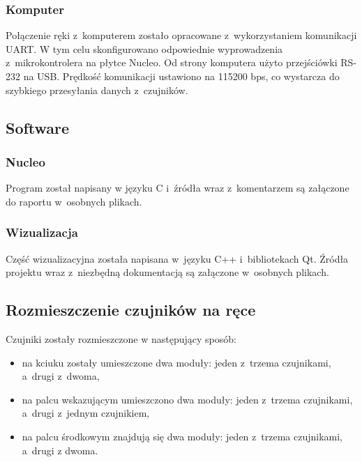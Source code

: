 \documentclass[a4paper,12pt]{article}
\begin{document}
			\subsubsection{Komputer}
				Połączenie ręki z~komputerem zostało opracowane z~wykorzystaniem komunikacji UART. W tym celu skonfigurowano odpowiednie wyprowadzenia z~mikrokontrolera na płytce Nucleo. Od strony komputera użyto przejściówki RS-232 na USB. Prędkość komunikacji ustawiono na 115200 bps, co wystarcza do szybkiego przesyłania danych z~czujników.	
		\subsection{Software}
			\subsubsection{Nucleo}
				Program został napisany w języku C i~źródła wraz z~komentarzem są załączone do raportu w~osobnych plikach.
			\subsubsection{Wizualizacja}
				Część wizualizacyjna została napisana w~języku C++ i~bibliotekach Qt. Źródła projektu wraz z~niezbędną dokumentacją są załączone w~osobnych plikach.
		\subsection{Rozmieszczenie czujników na ręce}
		Czujniki zostały rozmieszczone w następujący sposób:
		\begin{itemize}
			\item na kciuku zostały umieszczone dwa moduły: jeden z~trzema czujnikami, a~drugi z~dwoma,
			\item na palcu wskazującym umieszczono dwa moduły: jeden z~trzema czujnikami, a~drugi z~jednym czujnikiem,
			\item na palcu środkowym znajdują się dwa moduły: jeden z~trzema czujnikami, a~drugi z dwoma.
		\end{itemize}
		
\end{document}
